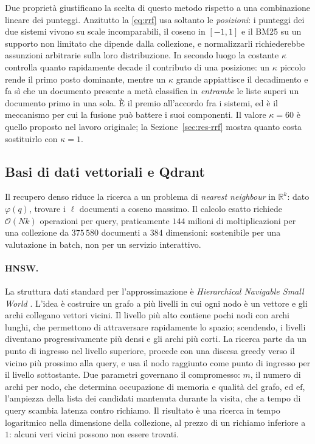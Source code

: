 \documentclass[pdflatex,sn-mathphys-num]{sn-jnl}
\theoremstyle{thmstyleone}
\theoremstyle{thmstyletwo}
\theoremstyle{thmstylethree}
\begin{document}
Due proprietà giustificano la scelta di questo metodo rispetto a una combinazione lineare dei punteggi. Anzitutto la \eqref{eq:rrf} usa soltanto le \emph{posizioni}: i punteggi dei due sistemi vivono su scale incomparabili, il coseno in $[-1,1]$ e il BM25 su un supporto non limitato che dipende dalla collezione, e normalizzarli richiederebbe assunzioni arbitrarie sulla loro distribuzione. In secondo luogo la costante $\kappa$ controlla quanto rapidamente decade il contributo di una posizione: un $\kappa$ piccolo rende il primo posto dominante, mentre un $\kappa$ grande appiattisce il decadimento e fa sì che un documento presente a metà classifica in \emph{entrambe} le liste superi un documento primo in una sola. È il premio all'accordo fra i sistemi, ed è il meccanismo per cui la fusione può battere i suoi componenti. Il valore $\kappa = 60$ è quello proposto nel lavoro originale; la Sezione~\ref{sec:res-rrf} mostra quanto costa sostituirlo con $\kappa = 1$.

\subsection{Basi di dati vettoriali e Qdrant}\label{sec:qdrant}

Il recupero denso riduce la ricerca a un problema di \emph{nearest neighbour} in $\mathbb{R}^k$: dato $\varphi(q)$, trovare i $\ell$ documenti a coseno massimo. Il calcolo esatto richiede $\mathcal{O}(Nk)$ operazioni per query, praticamente $144$ milioni di moltiplicazioni per una collezione da $375\,580$ documenti a $384$ dimensioni: sostenibile per una valutazione in batch, non per un servizio interattivo.

\paragraph{HNSW.} La struttura dati standard per l'approssimazione è \emph{Hierarchical Navigable Small World} \cite{malkov2020hnsw}. L'idea è costruire un grafo a più livelli in cui ogni nodo è un vettore e gli archi collegano vettori vicini. Il livello più alto contiene pochi nodi con archi lunghi, che permettono di attraversare rapidamente lo spazio; scendendo, i livelli diventano progressivamente più densi e gli archi più corti. La ricerca parte da un punto di ingresso nel livello superiore, procede con una discesa greedy verso il vicino più prossimo alla query, e usa il nodo raggiunto come punto di ingresso per il livello sottostante. Due parametri governano il compromesso: $m$, il numero di archi per nodo, che determina occupazione di memoria e qualità del grafo, ed $\mathrm{ef}$, l'ampiezza della lista dei candidati mantenuta durante la visita, che a tempo di query scambia latenza contro richiamo. Il risultato è una ricerca in tempo logaritmico nella dimensione della collezione, al prezzo di un richiamo inferiore a $1$: alcuni veri vicini possono non essere trovati.
\end{document}
